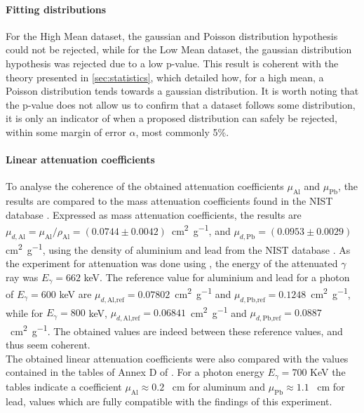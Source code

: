 \paragraph{Fitting distributions}
For the High Mean dataset, the gaussian and Poisson distribution hypothesis could not be rejected, while for the Low Mean dataset, the gaussian distribution hypothesis was rejected due to a low p-value. This result is coherent with the theory presented in \autoref{sec:statistics}, which detailed how, for a high mean, a Poisson distribution tends towards a gaussian distribution. It is worth noting that the p-value does not allow us to confirm that a dataset follows some distribution, it is only an indicator of when a proposed distribution can safely be rejected, within some margin of error \(\alpha\), most commonly 5\%.

\paragraph{Linear attenuation coefficients}
To analyse the coherence of the obtained attenuation coefficients \(\mu_\textrm{Al}\) and \(\mu_\textrm{Pb}\), the results are compared to the mass attenuation coefficients found in the NIST database \cite{massic-linear-attenuation}. 
Expressed as mass attenuation coefficients, the results are \linebreak \mbox{\(\mu_{d,\textrm{Al}} = \mu_{\textrm{Al}} / \rho_\textrm{Al} = \left(0.0744 \pm 0.0042\right)\) \si{\centi\meter\squared\per\gram}}, and \(\mu_{d,\textrm{Pb}} = \left(0.0953 \pm 0.0029\right)\) \si{\centi\meter\squared\per\gram}, using the density of aluminium and lead from the NIST database \cite{material-density}. 
As the experiment for attenuation was done using \cesium, the energy of the attenuated \(\gamma\) ray was \(E_\gamma = 662\) keV.
The reference value for aluminium and lead for a photon of \(E_\gamma = 600\) keV are \mbox{\(\mu_{d,\textrm{Al,ref}} = 0.07802\) \si{\centi\meter\squared\per\gram}} and \mbox{\(\mu_{d,\textrm{Pb,ref}} = 0.1248\) \si{\centi\meter\squared\per\gram}}, while for \(E_\gamma = 800\) keV, \mbox{\(\mu_{d,\textrm{Al,ref}} = 0.
06841\) \si{\centi\meter\squared\per\gram}} and \linebreak \mbox{\(\mu_{d,\textrm{Pb,ref}} = 0.0887\) \si{\centi\meter\squared\per\gram}}. 
The obtained values are indeed between these reference values, and thus seem coherent. \\
The obtained linear attenuation coefficients were also compared 
with the values contained in the tables of Annex D of \cite{notice_generale}.
For a photon energy $E_{\gamma} = 700$ KeV the tables indicate a coefficient 
$\mu_{\mathrm{Al}} \approx 0.2$ \unit{\per\cm} for aluminum and 
$\mu_{\mathrm{Pb}} \approx 1.1$ \unit{\per\cm} for lead,
values which are fully compatible with the findings of this experiment.

